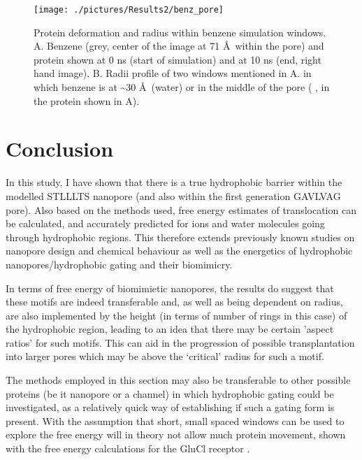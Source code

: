 \begin{figure}[H]
\begin{center}
\texttt{[image: ./pictures/Results2/benz\_pore]}
\caption[Protein deformation and radius within benzene simulation windows.] {Protein deformation and radius within benzene simulation windows. A. Benzene (grey, center of the image at 71 \AA\ within the pore) and protein shown at 0 ns (start of simulation) and at 10 ns (end, right hand image). B. Radii profile of two windows mentioned in A. in which benzene is at \textasciitilde 30 \AA\ (water) or in the middle of the pore ( \angstrom, in the protein shown in A).}
\label{fig:benz_pore}
\end{center}
\end{figure}

\newpage

\section{Conclusion}


In this study, I have shown that there is a true hydrophobic barrier within the modelled STLLLTS nanopore (and also within the first generation GAVLVAG pore). Also based on the methods used, free energy estimates of translocation can be calculated, and accurately predicted for ions and water molecules going through hydrophobic regions. This therefore extends previously known studies on nanopore design and chemical behaviour as well as the energetics of hydrophobic nanopores/hydrophobic gating and their biomimicry. 

In terms of free energy of biomimietic nanopores, the results do suggest that these motifs are indeed transferable and, as well as being dependent on radius, are also implemented by the height (in terms of number of rings in this case) of the hydrophobic region, leading to an idea that there may be certain 'aspect ratios' for such motifs. This can aid in the progression of possible transplantation into larger pores which may be above the `critical' radius for such a motif. 

The methods employed in this section may also be transferable to other possible proteins (be it nanopore or a channel) in which hydrophobic gating could be investigated, as a relatively quick way of establishing if such a gating form is present. With the assumption that short, small spaced windows  can be used to explore the free energy will in theory not allow much protein movement, shown with the free energy calculations for the GluCl receptor \cite{Yoluk2015}. 

